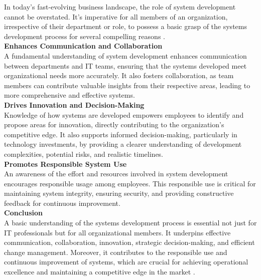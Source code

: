 \documentclass[12pt,a4paper]{article}
\begin{document}
In today's fast-evolving business landscape, the role of system development cannot be overstated. It's imperative for all members of an organization, irrespective of their department or role, to possess a basic grasp of the systems development process for several compelling reasons \citep{question_1.1}.\\

\noindent \textbf{Enhances Communication and Collaboration}\\
A fundamental understanding of system development enhances communication between departments and IT teams, ensuring that the systems developed meet organizational needs more accurately. It also fosters collaboration, as team members can contribute valuable insights from their respective areas, leading to more comprehensive and effective systems.\\

\noindent \textbf{Drives Innovation and Decision-Making}\\
Knowledge of how systems are developed empowers employees to identify and propose areas for innovation, directly contributing to the organization's competitive edge. It also supports informed decision-making, particularly in technology investments, by providing a clearer understanding of development complexities, potential risks, and realistic timelines.\\

\noindent \textbf{Promotes Responsible System Use}\\
An awareness of the effort and resources involved in system development encourages responsible usage among employees. This responsible use is critical for maintaining system integrity, ensuring security, and providing constructive feedback for continuous improvement.\\

\noindent \textbf{Conclusion}\\
A basic understanding of the systems development process is essential not just for IT professionals but for all organizational members. It underpins effective communication, collaboration, innovation, strategic decision-making, and efficient change management. Moreover, it contributes to the responsible use and continuous improvement of systems, which are crucial for achieving operational excellence and maintaining a competitive edge in the market \citep{question_1.2}.\\



\pagebreak %
\end{document}
